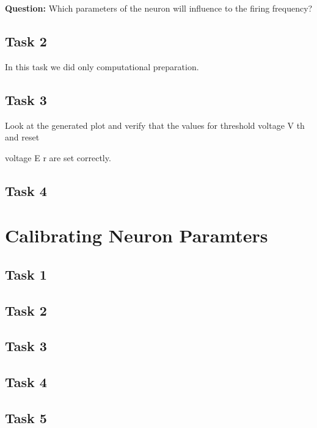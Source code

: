 \documentclass[10pt,a4paper]{scrartcl}
\begin{document}
\noindent \textbf{Question:} Which parameters of the neuron will influence to the firing frequency? 


\subsection{Task 2}
In this task we did only computational preparation.


\subsection{Task 3}
Look at the generated plot and verify that the values for threshold voltage V th and reset



voltage E r are set correctly.


\subsection{Task 4}


\newpage



\section{Calibrating Neuron Paramters}


\subsection{Task 1}

\subsection{Task 2}

\subsection{Task 3}

\subsection{Task 4}

\subsection{Task 5}
\end{document}
